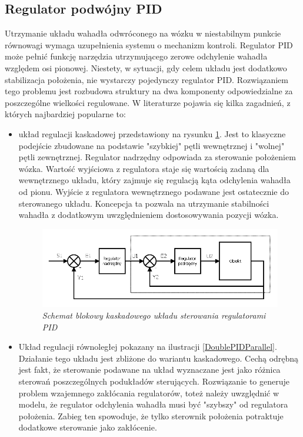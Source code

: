 \documentclass[12pt, oneside]{report}
\theoremstyle{definition}
\begin{document}
\subsection{Regulator podwójny PID}
\label{DoublePID}
Utrzymanie układu wahadła odwróconego na wózku w niestabilnym punkcie równowagi wymaga uzupełnienia systemu o mechanizm kontroli. Regulator PID może pełnić funkcję narzędzia utrzymującego zerowe odchylenie wahadła względem osi pionowej. Niestety, w sytuacji, gdy celem układu jest dodatkowo stabilizacja położenia, nie wystarczy pojedynczy regulator PID. Rozwiązaniem tego problemu jest rozbudowa struktury na dwa komponenty odpowiedzialne za poszczególne wielkości regulowane. W literaturze pojawia się kilka zagadnień, z których najbardziej popularne to:
\begin{itemize}
\item układ regulacji kaskadowej przedstawiony na rysunku \ref{DoublePIDCascade}. Jest to klasyczne podejście zbudowane na podstawie "szybkiej" pętli wewnętrznej i "wolnej" pętli zewnętrznej. Regulator nadrzędny odpowiada za sterowanie położeniem wózka. Wartość wyjściowa z regulatora staje się wartością zadaną dla wewnętrznego układu, który zajmuje się regulacją kąta odchylenia wahadła od pionu. Wyjście z regulatora wewnętrznego podawane jest ostatecznie do sterowanego układu. Koncepcja ta pozwala na utrzymanie stabilności wahadła z dodatkowym uwzględnieniem dostosowywania pozycji wózka.
\begin{figure}[H]
	\centering
		\includegraphics[width = 300pt]{DoublePIDCascade} 
		\caption{\textit{Schemat blokowy kaskadowego układu sterowania regulatorami PID\cite{JTJT}}}
		\label{DoublePIDCascade}
\end{figure}
\item Układ regulacji równoległej pokazany na ilustracji \ref{DoublePIDParallel}. Działanie tego układu jest zbliżone do wariantu kaskadowego. Cechą odrębną jest fakt, że sterowanie podawane na układ wyznaczane jest jako różnica sterowań poszczególnych podukładów sterujących. Rozwiązanie to generuje problem wzajemnego zakłócania regulatorów, toteż należy uwzględnić w modelu, że regulator odchylenia wahadła musi być "szybszy" od regulatora położenia. Zabieg ten spowoduje, że tylko sterownik położenia potraktuje dodatkowe sterowanie jako zakłócenie.

\end{itemize}
\end{document}
